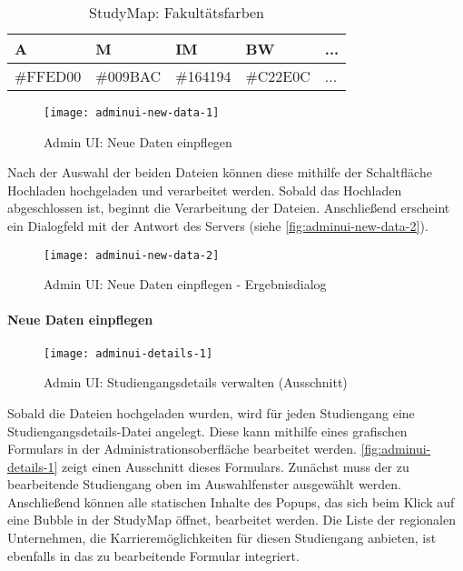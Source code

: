 \begin{table}[!ht]
    \centering
    \begin{tabular}{|l|l|l|l|l|}
    \hline
    \textbf{A} & \textbf{M} & \textbf{IM} & \textbf{BW} & \textbf{...} \\ \hline
    \#FFED00   & \#009BAC   & \#164194    & \#C22E0C    & ... \\ \hline         
    \end{tabular}

    \caption{StudyMap: Fakultätsfarben}
    \label{table:input-file-faculties}
\end{table}

\begin{figure}[H]
    \centering
    \texttt{[image: adminui-new-data-1]}
    \caption{Admin UI: Neue Daten einpflegen}
    \label{fig:adminui-new-data-1}
\end{figure}

Nach der Auswahl der beiden Dateien können diese mithilfe der Schaltfläche \glqq Hochladen\grqq{} hochgeladen und verarbeitet werden. Sobald das Hochladen abgeschlossen ist, beginnt die Verarbeitung der Dateien. Anschließend erscheint ein Dialogfeld mit der Antwort des Servers (siehe \autoref{fig:adminui-new-data-2}).

\begin{figure}[H]
    \centering
    \texttt{[image: adminui-new-data-2]}
    \caption{Admin UI: Neue Daten einpflegen - Ergebnisdialog}
    \label{fig:adminui-new-data-2}
\end{figure}

\paragraph*{Neue Daten einpflegen}
\begin{figure}[H]
    \centering
    \texttt{[image: adminui-details-1]}
    \caption{Admin UI: Studiengangsdetails verwalten (Ausschnitt)}
    \label{fig:adminui-details-1}
\end{figure}

Sobald die Dateien hochgeladen wurden, wird für jeden Studiengang eine Studiengangsdetails-Datei angelegt. Diese kann mithilfe eines grafischen Formulars in der Administrationsoberfläche bearbeitet werden. \autoref{fig:adminui-details-1} zeigt einen Ausschnitt dieses Formulars. Zunächst muss der zu bearbeitende Studiengang oben im Auswahlfenster ausgewählt werden. Anschließend können alle statischen Inhalte des Popups, das sich beim Klick auf eine Bubble in der StudyMap öffnet, bearbeitet werden. Die Liste der regionalen Unternehmen, die Karrieremöglichkeiten für diesen Studiengang anbieten, ist ebenfalls in das zu bearbeitende Formular integriert.

